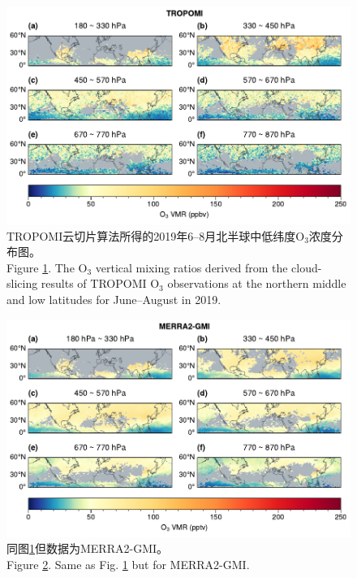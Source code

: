 \begin{figure}[!htbp]
    \centering
    \includegraphics[width=15cm]{./figures/uto3_tropomi.pdf}
    \caption{
    TROPOMI云切片算法所得的2019年6--8月北半球中低纬度O$_3$浓度分布图。 \\
    Figure \ref{fig:uto3_tropomi}. The O$_3$ vertical mixing ratios derived from the cloud-slicing results of TROPOMI O$_3$ observations at the northern middle and low latitudes for June--August in 2019.
    }
    \label{fig:uto3_tropomi}
\end{figure}


\begin{figure}[!htbp]
    \centering
    \includegraphics[width=15cm]{./figures/uto3_merra2-gmi.pdf}
    \caption{
    同图\ref{fig:uto3_tropomi}但数据为MERRA2-GMI。 \\
    Figure \ref{fig:uto3_merra2}. Same as Fig. \ref{fig:uto3_tropomi} but for MERRA2-GMI.
    }
    \label{fig:uto3_merra2}
\end{figure}


